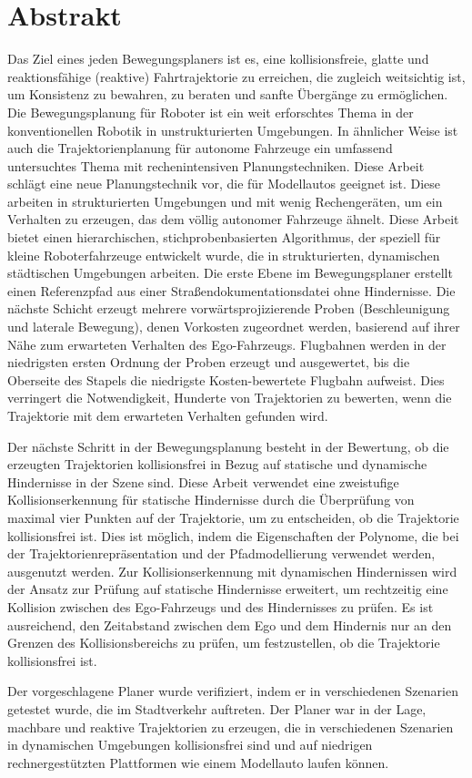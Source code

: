 \chapter*{Abstrakt}
Das Ziel eines jeden Bewegungsplaners ist es, eine kollisionsfreie, glatte und reaktionsfähige (reaktive) Fahrtrajektorie zu erreichen, die zugleich weitsichtig ist, um Konsistenz zu bewahren, zu beraten und sanfte Übergänge zu ermöglichen. Die Bewegungsplanung für Roboter ist ein weit erforschtes Thema in der konventionellen Robotik in unstrukturierten Umgebungen. In ähnlicher Weise ist auch die Trajektorienplanung für autonome Fahrzeuge ein umfassend untersuchtes Thema mit rechenintensiven Planungstechniken. Diese Arbeit schlägt eine neue Planungstechnik vor, die für Modellautos geeignet ist. Diese arbeiten in strukturierten Umgebungen und mit wenig Rechengeräten, um ein Verhalten zu erzeugen, das dem völlig autonomer Fahrzeuge ähnelt. Diese Arbeit bietet einen hierarchischen, stichprobenbasierten Algorithmus, der speziell für kleine Roboterfahrzeuge entwickelt wurde, die in strukturierten, dynamischen städtischen Umgebungen arbeiten. Die erste Ebene im Bewegungsplaner erstellt einen Referenzpfad aus einer Straßendokumentationsdatei ohne Hindernisse. Die nächste Schicht erzeugt mehrere vorwärtsprojizierende Proben (Beschleunigung und laterale Bewegung), denen Vorkosten zugeordnet werden, basierend auf ihrer Nähe zum erwarteten Verhalten des Ego-Fahrzeugs. Flugbahnen werden in der niedrigsten ersten Ordnung der Proben erzeugt und ausgewertet, bis die Oberseite des Stapels die niedrigste Kosten-bewertete Flugbahn aufweist. Dies verringert die Notwendigkeit, Hunderte von Trajektorien zu bewerten, wenn die Trajektorie mit dem erwarteten Verhalten gefunden wird.


Der nächste Schritt in der Bewegungsplanung besteht in der Bewertung, ob die erzeugten Trajektorien kollisionsfrei in Bezug auf statische und dynamische Hindernisse in der Szene sind. Diese Arbeit verwendet eine zweistufige Kollisionserkennung für statische Hindernisse durch die Überprüfung von maximal vier Punkten auf der Trajektorie, um zu entscheiden, ob die Trajektorie kollisionsfrei ist. Dies ist möglich, indem die Eigenschaften der Polynome, die bei der Trajektorienrepräsentation und der Pfadmodellierung verwendet werden, ausgenutzt werden. Zur Kollisionserkennung mit dynamischen Hindernissen wird der Ansatz zur Prüfung auf statische Hindernisse erweitert, um rechtzeitig eine Kollision zwischen des Ego-Fahrzeugs und des Hindernisses zu prüfen. Es ist ausreichend, den Zeitabstand zwischen dem Ego und dem Hindernis nur an den Grenzen des Kollisionsbereichs zu prüfen, um festzustellen, ob die Trajektorie kollisionsfrei ist.


Der vorgeschlagene Planer wurde verifiziert, indem er in verschiedenen Szenarien getestet wurde, die im Stadtverkehr auftreten. Der Planer war in der Lage, machbare und reaktive Trajektorien zu erzeugen, die in verschiedenen Szenarien in dynamischen Umgebungen kollisionsfrei sind und auf niedrigen rechnergestützten Plattformen wie einem Modellauto laufen können.



